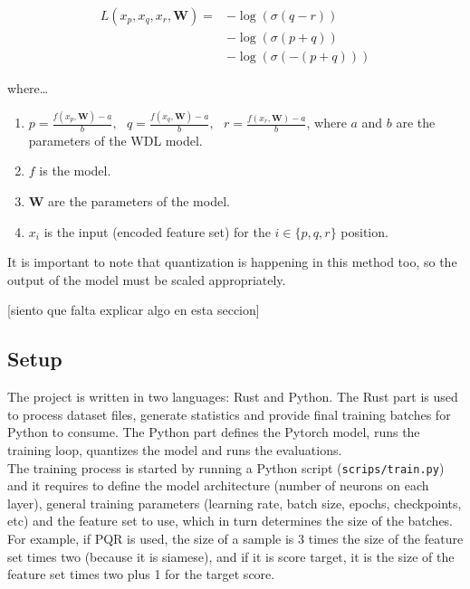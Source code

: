 
\begin{align*}
L(x_p, x_q, x_r, \bm{W})=
& -\log\left(\sigma(q - r)\right) \\
& -\log\left(\sigma(p + q)\right) \\
& -\log\left(\sigma(-(p + q))\right)
\end{align*}

where\dots

\begin{enumerate}
\itemsep0em
\item $
p = \frac{f(x_p, \bm{W}) - a}{b},\text{ }
q = \frac{f(x_q, \bm{W}) - a}{b},\text{ }
r = \frac{f(x_r, \bm{W}) - a}{b}
$, where $a$ and $b$ are the parameters of the WDL model.
\item $f$ is the model.
\item $\bm{W}$ are the parameters of the model.
\item $x_i$ is the input (encoded feature set) for the $i \in \{p,q,r\}$ position.
\end{enumerate}

It is important to note that quantization is happening in this method too, so the output of the model must be scaled appropriately.

[siento que falta explicar algo en esta seccion]

\subsection{Setup}


The project is written in two languages: Rust and Python. The Rust part is used to process dataset files, generate statistics and provide final training batches for Python to consume. The Python part defines the Pytorch model, runs the training loop, quantizes the model and runs the evaluations. \\

The training process is started by running a Python script (\texttt{scrips/train.py}) and it requires to define the model architecture (number of neurons on each layer), general training parameters (learning rate, batch size, epochs, checkpoints, etc) and the feature set to use, which in turn determines the size of the batches. For example, if PQR is used, the size of a sample is 3 times the size of the feature set times two (because it is siamese), and if it is score target, it is the size of the feature set times two plus 1 for the target score.

